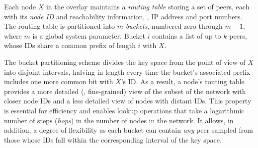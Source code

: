 Each node $X$ in the overlay maintains a \emph{routing table} storing a set of peers, each with its \emph{node ID} and reachability information, \ie, IP address and port numbers.
The routing table is partitioned into $m$ \textit{buckets}, numbered zero through $m-1$, where $m$ is a global system parameter.
Bucket $i$ contains a list of up to $k$ peers, whose IDs share a common prefix of length $i$ with $X$.





%
The bucket partitioning scheme divides the key space from the point of view of $X$ into disjoint intervals, halving in length every time the bucket's associated prefix includes one more common bit with $X$'s ID.
As a result, a node's routing table provides a more detailed (\ie, fine-grained) view of the subset of the network with closer node IDs and a less detailed view of nodes with distant IDs.
This property is essential for efficiency and enables lookup operations that take a logarithmic number of steps (\emph{hops}) in the number of nodes in the network.
It allows, in addition, a degree of flexibility as each bucket can contain \textit{any} peer sampled from those whose IDs fall within the corresponding interval of the key space.

